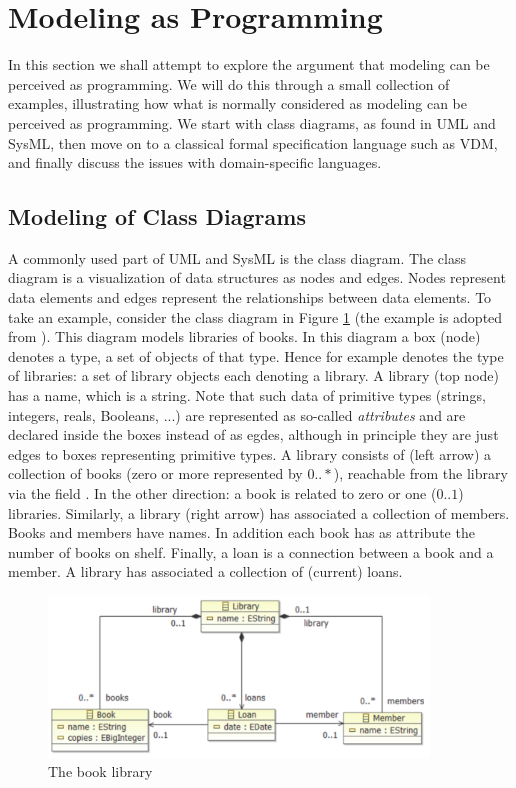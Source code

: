 
\section{Modeling as Programming}
\label{sec:modeling-as-programming}

In this section we shall attempt to explore the argument that
modeling can be perceived as programming. We will do this through
a small collection of examples, illustrating how what is normally
considered as modeling can be perceived as programming. We start
with class diagrams, as found in UML and SysML, then move on to
a classical formal specification language such as VDM, and finally discuss the issues with domain-specific languages.

\subsection{Modeling of Class Diagrams}
\label{sec:complex-classes-in-scala}

A commonly used part of UML and SysML is the class diagram. The class diagram is a visualization of data structures as nodes and edges. Nodes represent data elements and edges represent the relationships between data elements. To take an
example, consider the class diagram in Figure \ref{fig:library}
(the example is adopted from \cite{?}). This diagram models libraries of books. In this diagram a box (node) denotes a type, a set of objects of that type. Hence for example  denotes the type of libraries: a set
of library objects each denoting a library.
A library (top node) has a name, which is a string. Note that
such data of primitive types (strings, integers, reals, Booleans, ...) are represented as so-called {\em attributes} and are declared inside the boxes instead of as egdes, although in principle they are just edges to boxes representing primitive types. A library consists of (left arrow) 
a collection of books (zero or more represented by $0 .. *$),
reachable from the library via the field . In the other direction: a book is related to zero or one ($0 .. 1$) libraries.
Similarly, a library (right arrow) has associated a collection of
members. Books and members have names. In addition each book has as
attribute the number of books on shelf. Finally, a loan is a connection between a book and a member. A library has associated
a collection of (current) loans.

\begin{figure}[ht]
\centering
\includegraphics[width=0.9\textwidth]{images/library.png}
\caption{The book library}
\label{fig:library}
\end{figure}

